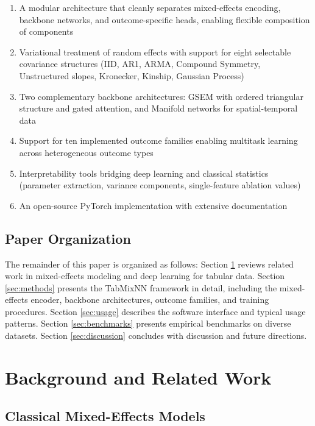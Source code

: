 \documentclass[12pt,a4paper]{article}
\begin{document}
\begin{enumerate}
    \item A modular architecture that cleanly separates mixed-effects encoding, backbone networks, and outcome-specific heads, enabling flexible composition of components
    \item Variational treatment of random effects with support for eight selectable covariance structures (IID, AR1, ARMA, Compound Symmetry, Unstructured slopes, Kronecker, Kinship, Gaussian Process)
    \item Two complementary backbone architectures: GSEM with ordered triangular structure and gated attention, and Manifold networks for spatial-temporal data
    \item Support for ten implemented outcome families enabling multitask learning across heterogeneous outcome types
    \item Interpretability tools bridging deep learning and classical statistics (parameter extraction, variance components, single-feature ablation values)
    \item An open-source PyTorch implementation with extensive documentation
\end{enumerate}

\subsection{Paper Organization}

The remainder of this paper is organized as follows: Section \ref{sec:background} reviews related work in mixed-effects modeling and deep learning for tabular data. Section \ref{sec:methods} presents the TabMixNN framework in detail, including the mixed-effects encoder, backbone architectures, outcome families, and training procedures. Section \ref{sec:usage} describes the software interface and typical usage patterns. Section \ref{sec:benchmarks} presents empirical benchmarks on diverse datasets. Section \ref{sec:discussion} concludes with discussion and future directions.

\section{Background and Related Work}
\label{sec:background}

\subsection{Classical Mixed-Effects Models}
\end{document}
